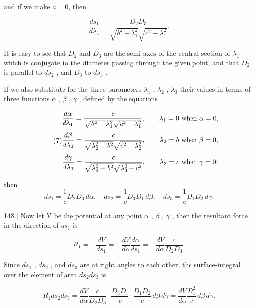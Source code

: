\documentclass[11pt,a4paper]{article}
\begin{document}
and if we make $a=0$, then

\begin{equation}\tag{6}
\frac{ds_1}{d\lambda_1} = \frac{D_2 D_3}{\sqrt{b^2 - \lambda_1^2} \sqrt{c^2 - \lambda_1^2}}.
\end{equation}

It is easy to see that  $D_2$  and  $D_3$  are the semi-axes of the central section of  $\lambda_1$  which is conjugate to the diameter passing through the given point, and that  $D_2$  is parallel to  $ds_2$ , and  $D_3$  to  $ds_3$ .

If we also substitute for the three parameters  $\lambda_1$ ,  $\lambda_2$ ,  $\lambda_3$  their values in terms of three functions  $\alpha$ ,  $\beta$ ,  $\gamma$ , defined by the equations

\begin{equation}\tag{7}
\begin{gathered}
\frac{d\alpha}{d\lambda_1}
=\frac{c}{\sqrt{b^2-\lambda_1^2}\sqrt{c^2-\lambda_1^2}},
\qquad \lambda_1=0 \hbox{ when } \alpha=0,\\[0.6ex]
\frac{d\beta}{d\lambda_2}
=\frac{c}{\sqrt{\lambda_2^2-b^2}\sqrt{c^2-\lambda_2^2}},
\qquad \lambda_2=b \hbox{ when } \beta=0,\\[0.6ex]
\frac{d\gamma}{d\lambda_3}
=\frac{c}{\sqrt{\lambda_3^2-b^2}\sqrt{\lambda_3^2-c^2}},
\qquad \lambda_3=c \hbox{ when } \gamma=0;
\end{gathered}
\end{equation}

then 
\begin{equation}\tag{8}
ds_1=\frac{1}{c}D_2D_3\,d\alpha,\quad
ds_2=\frac{1}{c}D_3D_1\,d\beta,\quad
ds_3=\frac{1}{c}D_1D_2\,d\gamma.
\end{equation}

148.] Now let V be the potential at any point  $\alpha$ ,  $\beta$ ,  $\gamma$ , then the resultant force in the direction of  $ds_1$  is

\begin{equation}\tag{9}
R_1=-\frac{dV}{ds_1}
=-\frac{dV}{d\alpha}\frac{d\alpha}{ds_1}
=-\frac{dV}{d\alpha}\frac{c}{D_2D_3}.
\end{equation}

Since  $ds_1$ ,  $ds_2$ , and  $ds_3$  are at right angles to each other, the surface-integral over the element of area  $ds_2 ds_3$  is

\begin{equation}\tag{10}
R_1ds_2ds_3
=\frac{dV}{d\alpha}\frac{c}{D_2D_3}
\cdot\frac{D_3D_1}{c}\cdot\frac{D_1D_2}{c}\,d\beta\,d\gamma
=\frac{dV}{d\alpha}\frac{D_1^2}{c}\,d\beta\,d\gamma.
\end{equation}
\end{document}
